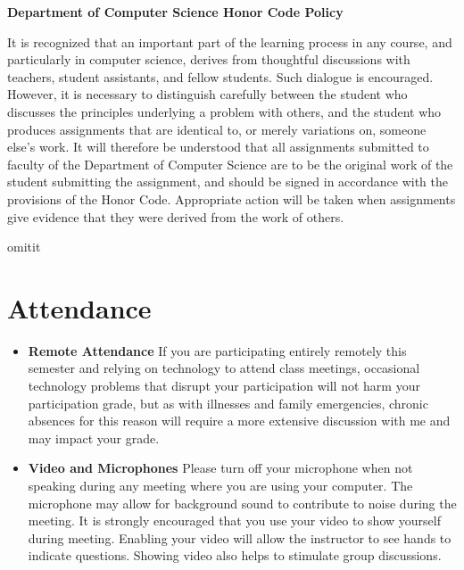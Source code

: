 \documentclass[11pt]{article} %
\begin{document}
\begin{center} \textbf{ Department of Computer Science Honor Code Policy } \end{center}
\vspace*{-.1in}
It is recognized that an important part of the learning process in any course, and particularly in computer science, derives from thoughtful discussions with teachers, student assistants, and fellow students. Such dialogue is encouraged. However, it is necessary to distinguish carefully between the student who discusses the principles underlying a problem with others, and the student who produces assignments that are identical to, or merely variations on, someone else's work. It will therefore be understood that all assignments submitted to faculty of the Department of Computer Science are to be the original work of the student submitting the assignment, and should be signed in accordance with the provisions of the Honor Code. Appropriate action will be taken when assignments give evidence that they were derived from the work of others.

omitit{
\section*{Attendance}


\begin{itemize}

\item \textbf{Remote Attendance}
If you are participating entirely remotely this semester and relying on technology to attend class meetings, occasional technology problems that disrupt your participation will not harm your participation grade, but as with illnesses and family emergencies, chronic absences for this reason will require a more extensive discussion with me and may impact your grade.


\item \textbf{Video and Microphones}
Please turn off your microphone when not speaking during any meeting where you are using your computer. The microphone may allow for background sound to contribute to noise during the meeting. It is strongly encouraged that you use your video to show yourself during meeting. Enabling your video will allow the instructor to see hands to indicate questions. Showing video also helps to stimulate group discussions.
\end{itemize}

}%
\end{document}
